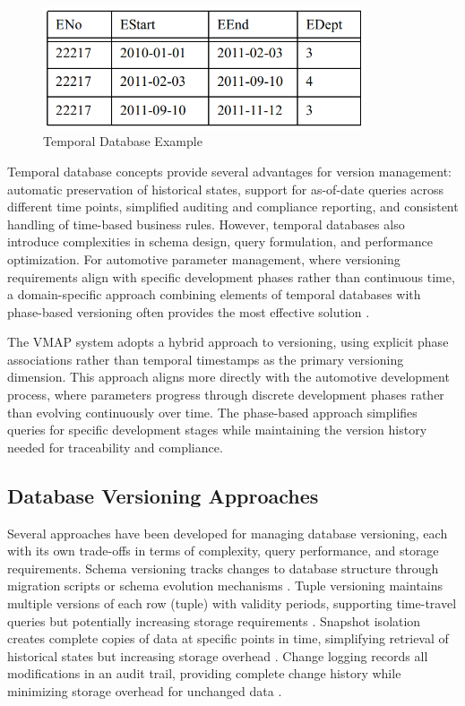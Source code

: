 \begin{figure}[ht]
    \centering
    \includegraphics[width=0.85\textwidth]{figures/temporal_database.png}
    \caption{Temporal Database Example \cite{kulkarni2012temporal}}
    \label{fig:temporal-database}
\end{figure}

Temporal database concepts provide several advantages for version management: automatic preservation of historical states, support for as-of-date queries across different time points, simplified auditing and compliance reporting, and consistent handling of time-based business rules. However, temporal databases also introduce complexities in schema design, query formulation, and performance optimization. For automotive parameter management, where versioning requirements align with specific development phases rather than continuous time, a domain-specific approach combining elements of temporal databases with phase-based versioning often provides the most effective solution \cite{bhattacherjee2015principles}.

The VMAP system adopts a hybrid approach to versioning, using explicit phase associations rather than temporal timestamps as the primary versioning dimension. This approach aligns more directly with the automotive development process, where parameters progress through discrete development phases rather than evolving continuously over time. The phase-based approach simplifies queries for specific development stages while maintaining the version history needed for traceability and compliance.

\subsection{Database Versioning Approaches}
\label{subsec:database-versioning-approaches}

Several approaches have been developed for managing database versioning, each with its own trade-offs in terms of complexity, query performance, and storage requirements. Schema versioning tracks changes to database structure through migration scripts or schema evolution mechanisms \cite{curino2009automating}. Tuple versioning maintains multiple versions of each row (tuple) with validity periods, supporting time-travel queries but potentially increasing storage requirements \cite{saracco2010matter}. Snapshot isolation creates complete copies of data at specific points in time, simplifying retrieval of historical states but increasing storage overhead \cite{bhattacherjee2015principles}. Change logging records all modifications in an audit trail, providing complete change history while minimizing storage overhead for unchanged data \cite{bhattacherjee2015principles}.

